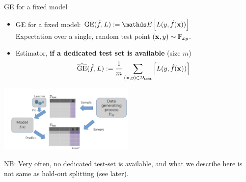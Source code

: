\begin{vbframe}{GE for a fixed model}
\begin{itemize}
  \item GE for a fixed model: $\GE(\fh, L) := \E \left[ L(y, \fxh) \right]$\\
      Expectation over a single, random test point $(\mathbf{x}, y) \sim \mathbb{P}_{xy}$.
  \item Estimator, \textbf{if a dedicated test set is available} (size $m$) 
    $$\widehat{\mathrm{GE}}(\hat{f}, L) := \frac{1}{m}\sum_{(\mathbf{x}, y) \in \mathcal{D}_{\text{test}}} \left[ L(y, \hat{f}(\mathbf{x})) \right]$$
    
  
\end{itemize}

\begin{center}
\includegraphics[trim = 0 0 0 30, clip, width=0.5\textwidth]
{figure_man/evaluation-intro-ge.pdf}
\end{center}
  
\vfill

NB: Very often, no dedicated test-set is available, and what we describe here is not same
as hold-out splitting (see later).

\end{vbframe}




